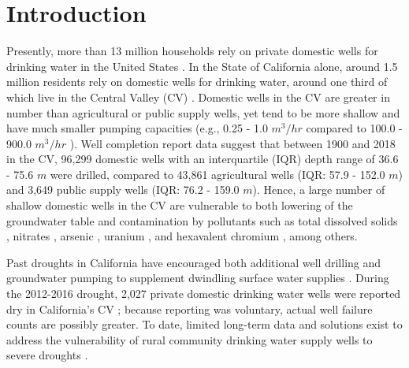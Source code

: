 \section{Introduction}

Presently, more than 13 million households rely on private domestic wells for drinking water in the United States \citep{uscensus2017}. In the State of California alone, around 1.5 million residents rely on domestic wells for drinking water, around one third of which live in the Central Valley (CV) \citep{Dieter2018}. Domestic wells in the CV are greater in number than agricultural or public supply wells, yet tend to be more shallow and have much smaller pumping capacities (e.g., 0.25 - 1.0 $m^3/hr$ compared to 100.0 - 900.0 $m^3/hr$ \citep{Harter2003}). Well completion report data \citep{oswcr} suggest that between 1900 and 2018 in the CV, 96,299 domestic wells with an interquartile (IQR) depth range of 36.6 - 75.6 $m$ were drilled, compared to 43,861 agricultural wells (IQR: 57.9 - 152.0 $m$) and 3,649 public supply wells (IQR: 76.2 - 159.0 $m$). Hence, a large number of shallow domestic wells in the CV are vulnerable to both lowering of the groundwater table \citep{theis1935relation, theis1940source, sophocleous2000safe, Greene2018, Perrone2019} and contamination by pollutants such as total dissolved solids \citep{Cismowski2006, Bertoldi1991}, nitrates \citep{Harter2012, Balazs2011, Ransom2017}, arsenic \citep{Welch2000, Ahuja2008}, uranium \citep{Jurgens2008, Fujii1995}, and hexavalent chromium \citep{Robertson1991, Ellis2002}, among others. 

Past droughts in California have encouraged both additional well drilling and groundwater pumping to supplement dwindling surface water supplies \citep{Hanak2011, Medellin-azuara2016}. During the 2012-2016 drought, 2,027 private domestic drinking water wells were reported dry in California's CV \citep{observedDW}; because reporting was voluntary, actual well failure counts are possibly greater. To date, limited long-term data and solutions exist to address the vulnerability of rural community drinking water supply wells to severe droughts \citep{Mitchell2017, Feinstein2017}. 

